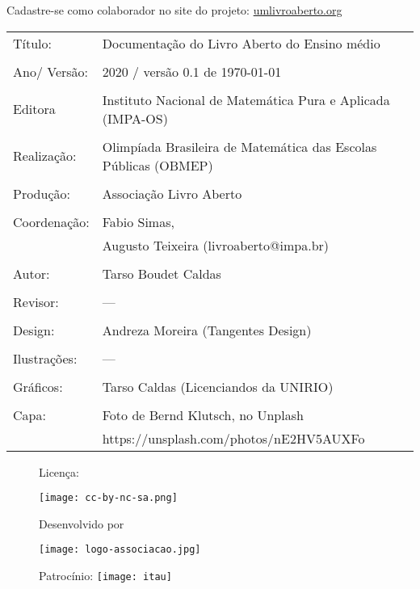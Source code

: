 \vspace*{.3cm}

Cadastre-se como colaborador no site do projeto: \url{umlivroaberto.org}


\begin{tabular}{p{}p{}}
Título: & Documentação do Livro Aberto do Ensino médio\\
\\
Ano/ Versão: & 2020 / versão 0.1 de \today\\
\\
Editora & Instituto Nacional de Matem\'atica Pura e Aplicada (IMPA-OS)\\
\\
Realização:& Olimp\'iada Brasileira de Matem\'atica das Escolas P\'ublicas (OBMEP)\\
\\
Produção:& Associação Livro Aberto\\
\\
Coordenação:& Fabio Simas, \\
			& Augusto Teixeira (livroaberto@impa.br)\\
\\
  Autor: & Tarso Boudet Caldas\\
        
           
\\
Revisor: &  --- \\
            
\\
Design: & Andreza Moreira (Tangentes Design) \\
\\
  Ilustrações: & --- \\ 
\\
Gráficos: & Tarso Caldas (Licenciandos da UNIRIO)\\
\\
  Capa: & Foto de Bernd Klutsch, no Unplash \\
  		& https://unsplash.com/photos/nE2HV5AUXFo
\end{tabular}
\vspace{.5cm}


\begin{figure}[b]
\begin{minipage}[l]{5cm}
\centering

{\large Licença:}

  \texttt{[image: cc-by-nc-sa.png]}
\end{minipage}\hfill
\begin{minipage}[c]{5cm}
\centering
{\large Desenvolvido por}

\texttt{[image: logo-associacao.jpg]}
\end{minipage}
\begin{minipage}[r]{5cm}
\centering

{\large Patrocínio:}
  \vspace{1em}
  \texttt{[image: itau]}
\end{minipage}
\end{figure}

